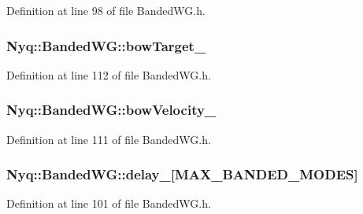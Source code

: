 Definition at line 98 of file Banded\+W\+G.\+h.

\subsubsection[{\texorpdfstring{bow\+Target\+\_\+}{bowTarget_}}]{ Nyq\+::\+Banded\+W\+G\+::bow\+Target\+\_\+\hspace{0.3cm}{\ttfamily [protected]}}\hypertarget{class_nyq_1_1_banded_w_g_abf58018df083448ce70200e7db672c9d}{}\label{class_nyq_1_1_banded_w_g_abf58018df083448ce70200e7db672c9d}


Definition at line 112 of file Banded\+W\+G.\+h.

\subsubsection[{\texorpdfstring{bow\+Velocity\+\_\+}{bowVelocity_}}]{ Nyq\+::\+Banded\+W\+G\+::bow\+Velocity\+\_\+\hspace{0.3cm}{\ttfamily [protected]}}\hypertarget{class_nyq_1_1_banded_w_g_a44b37658ac5f9396c925d5a6c56f3704}{}\label{class_nyq_1_1_banded_w_g_a44b37658ac5f9396c925d5a6c56f3704}


Definition at line 111 of file Banded\+W\+G.\+h.

\subsubsection[{\texorpdfstring{delay\+\_\+}{delay_}}]{ Nyq\+::\+Banded\+W\+G\+::delay\+\_\+\mbox{[}{\bf M\+A\+X\+\_\+\+B\+A\+N\+D\+E\+D\+\_\+\+M\+O\+D\+ES}\mbox{]}\hspace{0.3cm}{\ttfamily [protected]}}\hypertarget{class_nyq_1_1_banded_w_g_a10fa4c5628882bdf654c34e75064e6f0}{}\label{class_nyq_1_1_banded_w_g_a10fa4c5628882bdf654c34e75064e6f0}


Definition at line 101 of file Banded\+W\+G.\+h.


